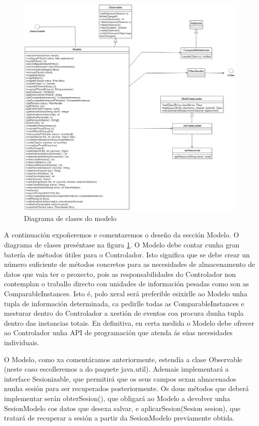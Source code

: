 \begin{figure}
\centering
\centerline{\includegraphics[width=1.4\textwidth,height=1.4\textheight,keepaspectratio]{figuras/UMLmodelo}}
\caption{Diagrama de clases do modelo}
\label{UMLmodelo}
\end{figure}

A continuación expoñeremos e comentaremos o deseño da sección Modelo. O diagrama de clases preséntase na figura \ref{UMLmodelo}. O Modelo debe contar cunha gran batería de métodos útiles para o Controlador. Isto significa que se debe crear un número suficiente de métodos concretos para as necesidades de almacenamento de datos que vaia ter o proxecto, pois as responsabilidades do Controlador non contemplan o traballo directo con unidades de información pesadas como son as ComparableInstances. Isto é, polo xeral será preferible esixirlle ao Modelo unha tupla de información determinada, ca pedirlle todas as ComparableInstances e mesturar dentro do Controlador a xestión de eventos coa procura dunha tupla dentro das instancias totais. En definitiva, en certa medida o Modelo debe ofrecer ao Controlador unha API de programación que atenda ás súas necesidades individuais.

O Modelo, como xa comentáramos anteriormente, estendía a clase Observable (neste caso escolleremos a do paquete java.util). Ademais implementará a interface Sesionizable, que permitirá que os seus campos sexan almacenados nunha sesión para ser recuperados posteriormente. Os dous métodos que deberá implementar serán obterSesion(), que obligará ao Modelo a devolver unha SesionModelo cos datos que desexa salvar, e aplicarSesion(Sesion sesion), que tratará de recuperar a sesión a partir da SesionModelo previamente obtida.

